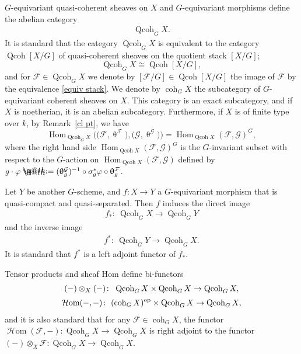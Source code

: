 \documentclass[pdftex]{sigma}%
\makeatletter
\newcommand*{\defeq}{\mathrel{\rlap{%
 \raisebox{0.3ex}{$\m@th\cdot$}}%
 \raisebox{-0.3ex}{$\m@th\cdot$}}%
 =}
\numberwithin{equation}{section}
\newcommand{\Hom}{\operatorname{Hom}}
\newcommand{\cHom}{\operatorname{{\mathcal H}om}}
\newcommand{\coh}{\operatorname{coh}}
\newcommand{\Qcoh}{\operatorname{Qcoh}}
\newcommand{\cF}{\mathcal{F}}
\newcommand{\cG}{\mathcal{G}}
\makeatother
\begin{document}
$G$-equivariant quasi-coherent sheaves on $X$ and $G$-equivariant morphisms define the abelian category
\begin{gather*}
\Qcoh_GX.
\end{gather*}
It is standard that the category $\Qcoh_GX$ is equivalent to the category $\Qcoh [X/G]$ of quasi-coherent sheaves on the quotient stack $[X/G]$;
\begin{equation}\label{equiv stack}
\Qcoh_GX\cong \Qcoh [X/G],
\end{equation}
 and for $\cF\in \Qcoh_GX$ we denote by $[\cF/G]\in \Qcoh [X/G]$ the image of $\cF$ by the equivalence \eqref{equiv stack}. We denote by $\coh_GX$ the subcategory of $G$-equivariant coherent sheaves on $X$. This category is an exact subcategory, and if $X$ is noetherian, it is an abelian subcategory. Furthermore, if $X$ is of finite type over $k$, by Remark~\ref{cl pt}, we have
\begin{equation}\label{G hom}
\Hom_{\Qcoh_GX}\big(\big(\cF,\uptheta^{\cF}\big),\big(\cG,\uptheta^{\cG}\big)\big) =\Hom_{\Qcoh X}(\cF,\cG)^G,
\end{equation}
where the right hand side $\Hom_{\Qcoh X}(\cF,\cG)^G$ is the $G$-invariant subset with respect to the $G$-action on $\Hom_{\Qcoh X}(\cF,\cG)$ defined by
$g\cdot\varphi\defeq (\uptheta^{\cG}_g)^{-1}\circ\sigma_g^*\varphi\circ\uptheta^{\cF}_g$.

Let $Y$ be another $G$-scheme, and $f\colon X\to Y$ a $G$-equivariant morphism that is quasi-compact and quasi-separated. Then $f$ induces the direct image\vspace{-.5ex}
\begin{gather*}
f_*\colon\ \Qcoh_G X\to \Qcoh_G Y
\end{gather*}
and the inverse image\vspace{-.5ex}
\begin{gather*}
f^*\colon\ \Qcoh_G Y\to \Qcoh_GX.
\end{gather*}
It is standard that $f^*$ is a left adjoint functor of $f_*$.

Tensor products and sheaf Hom define bi-functors
\begin{gather*}
(-)\otimes_{X}(-)\colon\ \Qcoh_G X\times \Qcoh_G X\to \Qcoh_G X,
\\[.5ex]
\cHom(-,-)\colon\ (\coh_G X)^{\rm op}\times \Qcoh_G X\to \Qcoh_G X,
\end{gather*}
and it is also standard that for any $\cF\in \coh_GX$, the functor $\cHom(\cF,-)\colon\Qcoh_G X\to \Qcoh_G X$ is right adjoint to the functor $(-)\otimes_{X}\cF\colon\Qcoh_G X\to \Qcoh_G X$.
\end{document}
